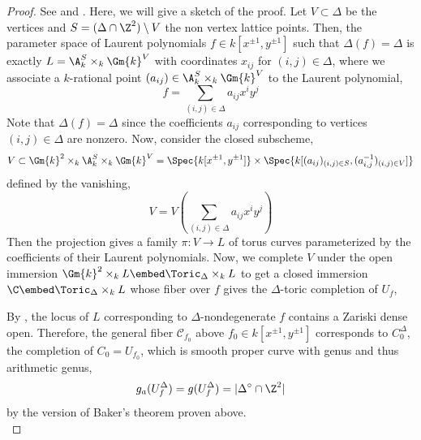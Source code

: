 \begin{proof}
See \cite[Section 2]{tim} and \cite[Section 2]{WC_zeta_functions}. Here, we will give a sketch of the proof. Let $V \subset \Delta$ be the vertices and $S = (\Delta \cap \Z^2) \setminus V$ the non vertex lattice points. Then, the parameter space of Laurent polynomials $f \in k[x^{\pm 1}, y^{\pm 1}]$ such that $\Delta(f) = \Delta$ is exactly $L = \A_k^{S} \times_k \Gm{k}^V$ with coordinates $x_{ij}$ for $(i,j) \in \Delta$, where we associate a $k$-rational point $(a_{ij}) \in \A_k^{S} \times_k \Gm{k}^V$ to the Laurent polynomial,
\[ f = \sum_{(i,j) \in \Delta} a_{ij} x^i y^j \]
Note that $\Delta(f) = \Delta$ since the coefficients $a_{ij}$ corresponding to vertices $(i,j) \in \Delta$ are nonzero.
Now, consider the closed subscheme,
\[ V \subset \Gm{k}^2 \times_k \A_k^{S} \times_k \Gm{k}^{V} = \Spec{k[x^{\pm 1}, y^{\pm 1}]} \times \Spec{k[(a_{ij})_{(i, j) \in S}, (a_{i,j}^{-1})_{(i,j) \in V}]} \]
defined by the vanishing,
\[ V = V\left( \sum_{(i,j) \in \Delta} a_{ij} x^i y^j \right) \]
Then the projection gives a family $\pi : V \to L$ of torus curves parameterized by the coefficients of their Laurent polynomials. Now, we complete $V$ under the open immersion $\Gm{k}^2 \times_k L \embed \Toric_\Delta \times_k L$ to get a closed immersion $\C \embed \Toric_\Delta \times_k L$ whose fiber over $f$ gives the $\Delta$-toric completion of $U_f$, 
\begin{center}
\end{center}
By \cite[Section 2, Prop. 1]{WC_zeta_functions}, the locus of $L$ corresponding to $\Delta$-nondegenerate $f$ contains a Zariski dense open. Therefore, the general fiber $\mathcal{C}_{f_0}$ above $f_0 \in k[x^{\pm 1}, y^{\pm 1}]$ corresponds to $C_0^\Delta$, the completion of $C_0 = U_{f_0}$, which is smooth proper curve with genus and thus arithmetic genus,
\[ g_a(U_f^\Delta) = g(U_f^\Delta) = | \Delta^\circ \cap \Z^2 | \]
by the version of Baker's theorem proven above.
\bigskip\\

\end{proof}
